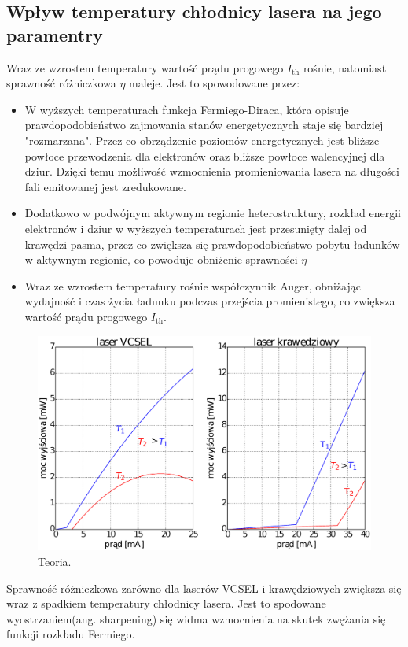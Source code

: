 \subsection{Wpływ temperatury chłodnicy lasera na jego paramentry}
Wraz ze wzrostem temperatury wartość prądu progowego $I_{\mathrm{th}}$ rośnie, natomiast sprawność różniczkowa $\eta$ maleje. Jest to spowodowane przez:
\begin{itemize}
\item W wyższych temperaturach funkcja Fermiego-Diraca, która opisuje prawdopodobieństwo zajmowania stanów energetycznych staje się bardziej "rozmarzana". Przez co obrządzenie poziomów energetycznych jest bliższe powłoce przewodzenia dla elektronów oraz bliższe powłoce walencyjnej dla dziur. Dzięki temu możliwość wzmocnienia promieniowania lasera na długości fali emitowanej jest zredukowane.
\item Dodatkowo w podwójnym aktywnym regionie heterostruktury, rozkład energii elektronów i dziur w wyższych temperaturach jest przesunięty dalej od krawędzi pasma, przez co zwiększa się prawdopodobieństwo pobytu ładunków w aktywnym regionie, co powoduje obniżenie sprawności $\eta$
\item Wraz ze wzrostem temperatury rośnie współczynnik Auger, obniżając wydajność i czas życia ładunku podczas przejścia promienistego, co zwiększa wartość prądu progowego $I_{\mathrm{th}}$.
\end{itemize}
\begin{figure}
\center
  \includegraphics[scale=0.30]{wykres2.eps}
  \caption{Teoria.}
  \label{teoria_rys_1}
\end{figure}
Sprawność różniczkowa zarówno dla laserów VCSEL i krawędziowych zwiększa się wraz z spadkiem temperatury chłodnicy lasera.
Jest to spodowane wyostrzaniem(ang. sharpening) się widma wzmocnienia na skutek zwężania się funkcji rozkładu Fermiego.
